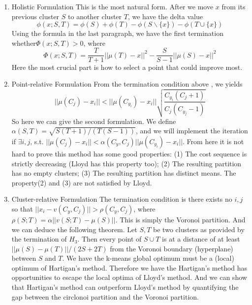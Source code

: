 \documentclass[twoside,11pt]{homework}
\begin{document}
\begin{enumerate}
    \item 
    Holistic Formulation\newline
    This is the most natural form. After we move $x$ from its previous cluster $S$ to another cluster $T$, we have the delta value
    $$\phi(x;S,T)=\phi(S)+\phi(T)-\phi(S\backslash\{x\})-\phi(T\cup \{x\})$$
    Using the formula in the last paragraph, we have the first termination whether$\Phi(x;S,T)>0$, where
    $$\Phi(x;S,T)=\frac{T}{T+1}||\mu(T)-x||^2-\frac{S}{S-1}||\mu(S)-x||^2$$
    Here the most crucial part is how to select a point that could improve most.
    \item
    Point-relative Formulation\newline
    From the termination condition above , we yields
    $$||\mu(C_j)-x_i||<||\mu(C_{y_i})-x_i||\sqrt{\frac{C_{y_i}(C_j+1)}{C_j(C_{y_j}-1)}}$$
    So here we can give the second formulation. We define $\alpha(S,T)=\sqrt{S(T+1)/(T(S-1))}$, and we will implement the iteration if $\exists i,j$, s.t. $||\mu(C_j)-x_i|| < \alpha (C_y,C_j)||\mu (C_{y_i})-x_i||$. From here it is not hard to prove this method has some good properties: (1) The cost sequence is strictly decreasing (Lloyd has this property too); (2) The resulting partition has no empty clusters; (3) The resulting partition has distinct means. The property(2) and (3) are not satisfied by Lloyd.
    \item
    Cluster-relative Formulation\newline
    The termination condition is there exists no $i,j$ so that $||x_i-v(C_y,C_j)|| > \rho(C_y, C_j)$, where $\rho(S;T)=\alpha ||v(S;T)-\mu(S)||$. This is simply the Voronoi partition. And we can deduce the following theorem. Let $S,T$ be two clusters as provided by the termination of $H_3$. Then every point of $S\cup T$ is at a distance of at least $||\mu(S) - \mu(T)||/(2S+2T)$ from the Voronoi boundary (hyperplane) between $S$ and $T$. We have the k-means global optimum must be a (local) optimum of Hartigan's method.\newline\newline
    Therefore we have the Hartigan's method has opportunities to escape the local optima of Lloyd's method. And we can show that Hartigan's method can outperform Lloyd's method by quantifying the gap between the circlonoi partition and the Voronoi partition.
\end{enumerate}
\end{document}
